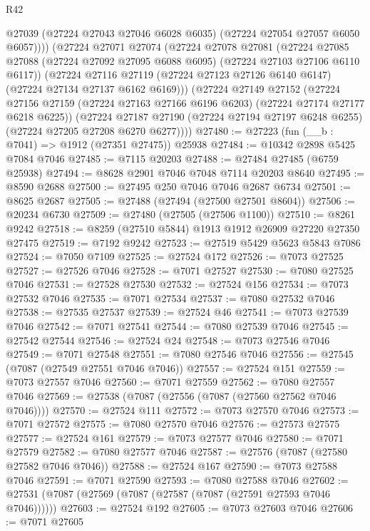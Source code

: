 \begin{lexlean}{R42}
\begin{coremodule}
{          @27039
          (@27224 @27043 @27046 @6028 @6035)
          (@27224 @27054 @27057 @6050 @6057))))
    (@27224
      @27071
      @27074
      (@27224
        @27078
        @27081
        (@27224 @27085 @27088 (@27224 @27092 @27095 @6088 @6095) (@27224 @27103 @27106 @6110 @6117))
        (@27224
          @27116
          @27119
          (@27224 @27123 @27126 @6140 @6147)
          (@27224 @27134 @27137 @6162 @6169)))
      (@27224
        @27149
        @27152
        (@27224 @27156 @27159 (@27224 @27163 @27166 @6196 @6203) (@27224 @27174 @27177 @6218 @6225))
        (@27224
          @27187
          @27190
          (@27224 @27194 @27197 @6248 @6255)
          (@27224 @27205 @27208 @6270 @6277))))
@27480 := @27223 (fun (__b : @7041) => @1912 (@27351 @27475)) @25938
@27484 := @10342 @2898 @5425 @7084 @7046
@27485 := @7115 @20203
@27488 := @27484 @27485 (@6759 @25938)
@27494 := @8628 @2901 @7046 @7048 @7114 @20203 @8640
@27495 := @8590 @2688
@27500 := @27495 @250 @7046 @7046 @2687 @6734
@27501 := @8625 @2687
@27505 := @27488 (@27494 (@27500 @27501 @8604))
@27506 := @20234 @6730
@27509 := @27480 (@27505 (@27506 @1100))
@27510 := @8261 @9242
@27518 := @8259 (@27510 @5844) @1913 @1912 @26909 @27220 @27350 @27475
@27519 := @7192 @9242
@27523 := @27519 @5429 @5623 @5843 @7086
@27524 := @7050 @7109
@27525 := @27524 @172
@27526 := @7073 @27525
@27527 := @27526 @7046
@27528 := @7071 @27527
@27530 := @7080 @27525 @7046
@27531 := @27528 @27530
@27532 := @27524 @156
@27534 := @7073 @27532 @7046
@27535 := @7071 @27534
@27537 := @7080 @27532 @7046
@27538 := @27535 @27537
@27539 := @27524 @46
@27541 := @7073 @27539 @7046
@27542 := @7071 @27541
@27544 := @7080 @27539 @7046
@27545 := @27542 @27544
@27546 := @27524 @24
@27548 := @7073 @27546 @7046
@27549 := @7071 @27548
@27551 := @7080 @27546 @7046
@27556 := @27545 (@7087 (@27549 @27551 @7046 @7046))
@27557 := @27524 @151
@27559 := @7073 @27557 @7046
@27560 := @7071 @27559
@27562 := @7080 @27557 @7046
@27569 := @27538 (@7087 (@27556 (@7087 (@27560 @27562 @7046 @7046))))
@27570 := @27524 @111
@27572 := @7073 @27570 @7046
@27573 := @7071 @27572
@27575 := @7080 @27570 @7046
@27576 := @27573 @27575
@27577 := @27524 @161
@27579 := @7073 @27577 @7046
@27580 := @7071 @27579
@27582 := @7080 @27577 @7046
@27587 := @27576 (@7087 (@27580 @27582 @7046 @7046))
@27588 := @27524 @167
@27590 := @7073 @27588 @7046
@27591 := @7071 @27590
@27593 := @7080 @27588 @7046
@27602 := @27531 (@7087 (@27569 (@7087 (@27587 (@7087 (@27591 @27593 @7046 @7046))))))
@27603 := @27524 @192
@27605 := @7073 @27603 @7046
@27606 := @7071 @27605
}
\end{coremodule}
\end{lexlean}

